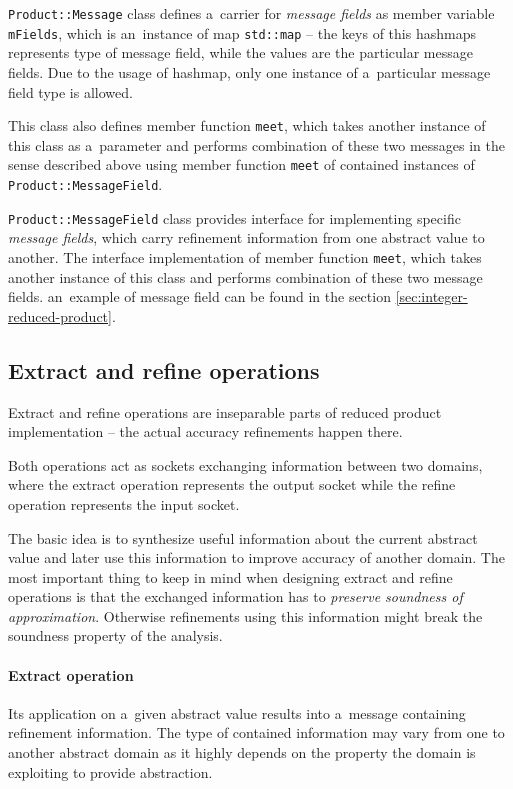 \documentclass[12pt,oneside]{fithesis2}
\theoremstyle{definition}
\begin{document}
\texttt{Product::Message} class defines a~carrier for \textit{message fields} as member variable \texttt{mFields}, which is an~instance of map \texttt{std::map} -- the keys of this hashmaps represents type of message field, while the values are the particular message fields. Due to the usage of hashmap, only one instance of a~particular message field type is allowed.

This class also defines member function \texttt{meet}, which takes another instance of this class as a~parameter and performs combination of these two messages in the sense described above using member function \texttt{meet} of contained instances of \texttt{Product::MessageField}.

\texttt{Product::MessageField} class provides interface for implementing specific \textit{message fields}, which carry refinement information from one abstract value to another. The interface implementation of member function \texttt{meet}, which takes another instance of this class and performs combination of these two message fields. an~example of message field can be found in the section \ref{sec:integer-reduced-product}.

\subsection{Extract and refine operations}

Extract and refine operations are inseparable parts of reduced product implementation -- the actual accuracy refinements happen there.

Both operations act as sockets exchanging information between two domains, where the extract operation represents the output socket while the refine operation represents the input socket.

The basic idea is to synthesize useful information about the current abstract value and later use this information to improve accuracy of another domain. The most important thing to keep in mind when designing extract and refine operations is that the exchanged information has to \textit{preserve soundness of approximation}. Otherwise refinements using this information might break the soundness property of the analysis.

\paragraph{Extract operation}
Its application on a~given abstract value results into a~message containing refinement information. The type of contained information may vary from one to another abstract domain as it highly depends on the property the domain is exploiting to provide abstraction.
\end{document}
